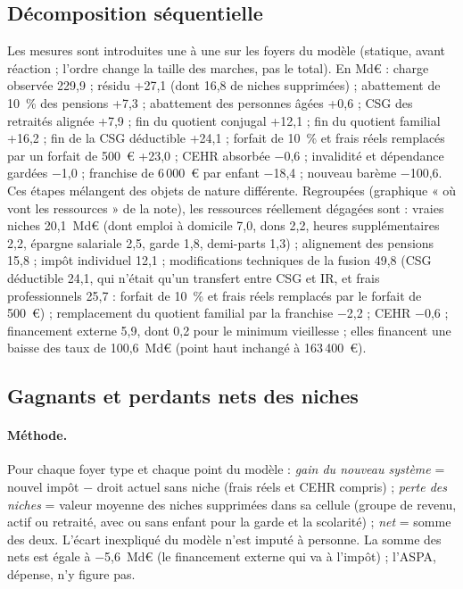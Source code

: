 \subsection{Décomposition séquentielle}

Les mesures sont introduites une à une sur les foyers du modèle (statique, avant réaction ; l'ordre change la taille des marches, pas le total). En Md€ : charge observée 229,9 ; résidu +27,1 (dont 16,8 de niches supprimées) ; abattement de 10~\% des pensions +7,3 ; abattement des personnes âgées +0,6 ; CSG des retraités alignée +7,9 ; fin du quotient conjugal +12,1 ; fin du quotient familial +16,2 ; fin de la CSG déductible +24,1 ; forfait de 10~\% et frais réels remplacés par un forfait de 500~€ +23,0 ; CEHR absorbée $-$0,6 ; invalidité et dépendance gardées $-$1,0 ; franchise de 6\,000~€ par enfant $-$18,4 ; nouveau barème $-$100,6. Ces étapes mélangent des objets de nature différente. Regroupées (graphique « où vont les ressources » de la note), les ressources réellement dégagées sont : vraies niches 20,1~Md€ (dont emploi à domicile 7,0, dons 2,2, heures supplémentaires 2,2, épargne salariale 2,5, garde 1,8, demi-parts 1,3) ; alignement des pensions 15,8 ; impôt individuel 12,1 ; modifications techniques de la fusion 49,8 (CSG déductible 24,1, qui n'était qu'un transfert entre CSG et IR, et frais professionnels 25,7 : forfait de 10~\% et frais réels remplacés par le forfait de 500~€) ; remplacement du quotient familial par la franchise $-$2,2 ; CEHR $-$0,6 ; financement externe 5,9, dont 0,2 pour le minimum vieillesse ; elles financent une baisse des taux de 100,6~Md€ (point haut inchangé à 163\,400~€).

\subsection{Gagnants et perdants nets des niches}

\paragraph{Méthode.} Pour chaque foyer type et chaque point du modèle : \emph{gain du nouveau système} = nouvel impôt $-$ droit actuel sans niche (frais réels et CEHR compris) ; \emph{perte des niches} = valeur moyenne des niches supprimées dans sa cellule (groupe de revenu, actif ou retraité, avec ou sans enfant pour la garde et la scolarité) ; \emph{net} = somme des deux. L'écart inexpliqué du modèle n'est imputé à personne. La somme des nets est égale à $-$5,6~Md€ (le financement externe qui va à l'impôt) ; l'ASPA, dépense, n'y figure pas.

